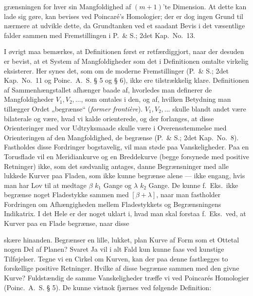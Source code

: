 \documentclass{article}
\begin{document}
grænsningen for hver sin Mangfoldighed af $(m + 1)$'te Dimension. At dette kan lade sig gøre, kan bevises ved Poincaré's Homologier; der er dog ingen Grund til nærmere at udvikle dette, da Grundtanken ved et saadant Bevis i det væsentlige falder sammen med Fremstillingen i P.\ \& S.; 2det Kap.\ No.\ 13.

I øvrigt maa bemærkes, at Definitionen først er retfærdiggjort, naar der desuden er bevist, at et System af Mangfoldigheder som det i Definitionen omtalte virkelig eksisterer. Her synes det, som om de moderne Fremstillinger (P.\ \& S.; 2det Kap.\ No.\ 11 og Poinc.\ A.~S. § 5 og § 6), ikke ere tilstrækkelig klare. Definitionen af Sammenhængstallet afhænger baade af, hvorledes man definerer de Mangfoldigheder $V_1, V_2, \dots$, som omtales i den, og af, hvilken Betydning man tillægger Ordet „begrænse“ (\emph{former frontière}). $V_1, V_2, \dots$ skulle blandt andet være bilaterale og være, hvad vi kalde orienterede, og der forlanges, at disse Orienteringer med vor Udtryksmaade skulle være i Overensstemmelse med Orienteringen af den Mangfoldighed, de begrænse (P.\ \& S.; 2det Kap.\ No.\ 8). Fastholdes disse Fordringer bogstavelig, vil man støde paa Vanskeligheder. Paa en Torusflade vil en Meridiankurve og en Breddekurve (begge forsynede med positive Retninger) ikke, som det sædvanlig antages, danne Begrænsninger med alle lukkede Kurver paa Fladen, som ikke kunne begrænse alene --- ikke engang, hvis man har Lov til at medtage $\beta$ $k_1$ Gange og $\lambda$ $k_2$ Gange. De kunne f.~Eks.\ ikke begrænse noget Fladestykke sammen med $[\beta + \lambda]$, naar man fastholder Fordringen om Afhængigheden mellem Fladestykkets og Begrænsningens Indikatrix. I det Hele er der noget uklart i, hvad man skal forstaa f.~Eks.\ ved, at Kurver paa en Flade begrænse, naar disse

skære hinanden. Begrænser en lille, lukket, plan Kurve af Form som et Ottetal nogen Del af Planen? Svaret Ja vil i alt Fald kun kunne faas ved kunstige Tilføjelser. Tegne vi en Cirkel om Kurven, kan der paa denne fastlægges to forskellige positive Retninger. Hvilke af disse begrænse sammen med den givne Kurve? Fuldstændig de samme Vanskeligheder træffe vi ved Poincarés Homologier (Poinc.\ A.~S. § 5). De kunne vistnok fjærnes ved følgende Definition:
\end{document}
